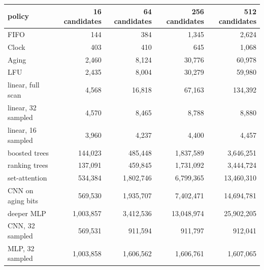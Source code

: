 \begin{tabular}{lrrrr}
\toprule
policy & 16 candidates & 64 candidates & 256 candidates & 512 candidates \\
\midrule
FIFO & 144 & 384 & 1,345 & 2,624 \\
Clock & 403 & 410 & 645 & 1,068 \\
Aging & 2,460 & 8,124 & 30,776 & 60,978 \\
LFU & 2,435 & 8,004 & 30,279 & 59,980 \\
linear, full scan & 4,568 & 16,818 & 67,163 & 134,392 \\
linear, 32 sampled & 4,570 & 8,465 & 8,788 & 8,880 \\
linear, 16 sampled & 3,960 & 4,237 & 4,400 & 4,457 \\
boosted trees & 144,023 & 485,448 & 1,837,589 & 3,646,251 \\
ranking trees & 137,091 & 459,845 & 1,731,092 & 3,444,724 \\
set-attention & 534,384 & 1,802,746 & 6,799,365 & 13,460,310 \\
CNN on aging bits & 569,530 & 1,935,707 & 7,402,471 & 14,694,781 \\
deeper MLP & 1,003,857 & 3,412,536 & 13,048,974 & 25,902,205 \\
CNN, 32 sampled & 569,531 & 911,594 & 911,797 & 912,041 \\
MLP, 32 sampled & 1,003,858 & 1,606,562 & 1,606,761 & 1,607,065 \\
\bottomrule
\end{tabular}
